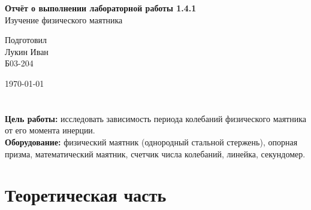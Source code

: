 \documentclass{article}
\begin{document}
\begin{titlepage}
	\vspace{5cm}
	{\huge
		\begin{center}
			{\bf Отчёт о выполнении лабораторной работы 1.4.1}\\
			Изучение физического маятника
		\end{center}
	}
	\vfill
	\begin{flushright}
		{\LARGE Подготовил\\ Лукин Иван \\
			\vspace{0.2cm}
			Б03-204}
	\end{flushright}
	\vspace{2cm}
	\begin{center}
		\today
	\end{center}
\end{titlepage}

\section*{}

\textbf{Цель работы:} исследовать зависимость периода колебаний физического маятника от его момента инерции. \\
\textbf{Оборудование:} физический маятник (однородный стальной стержень), опорная призма, математический маятник, счетчик числа колебаний, линейка, секундомер.

\section{Теоретическая часть}
\end{document}
